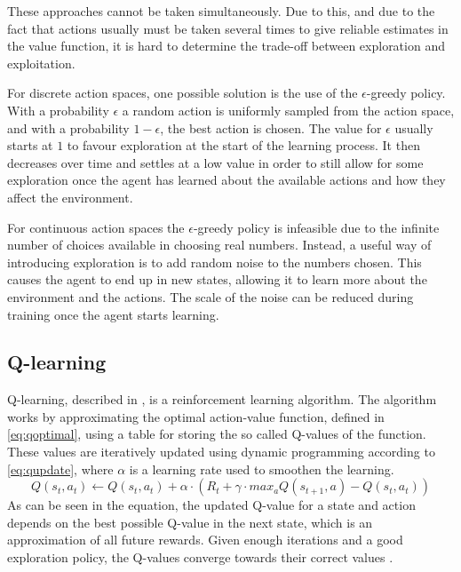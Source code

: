 \documentclass{kththesis}
\begin{document}
These approaches cannot be taken simultaneously. Due to this, and due to the fact that actions usually must be taken several times to give reliable estimates in the value function, it is hard to determine the trade-off between exploration and exploitation.

For discrete action spaces, one possible solution is the use of the $\epsilon$-greedy policy. With a probability $\epsilon$ a random action is uniformly sampled from the action space, and with a probability $1 - \epsilon$, the best action is chosen. The value for $\epsilon$ usually starts at $1$ to favour exploration at the start of the learning process. It then decreases over time and settles at a low value in order to still allow for some exploration once the agent has learned about the available actions and how they affect the environment. \parencite{sutton1998introduction}

For continuous action spaces the $\epsilon$-greedy policy is infeasible due to the infinite number of choices available in choosing real numbers. Instead, a useful way of introducing exploration is to add random noise to the numbers chosen. This causes the agent to end up in new states, allowing it to learn more about the environment and the actions. The scale of the noise can be reduced during training once the agent starts learning. \parencite{lillicrap2015continuous}

\subsection{Q-learning}
\label{subsec:qlearning}
Q-learning, described in \parencite{watkins1992q}, is a reinforcement learning algorithm. The algorithm works by approximating the optimal action-value function, defined in \autoref{eq:qoptimal}, using a table for storing the so called Q-values of the function. These values are iteratively updated using dynamic programming according to \autoref{eq:qupdate}, where $\alpha$ is a learning rate used to smoothen the learning. 
\begin{equation}
\label{eq:qupdate}
Q(s_t, a_t) \leftarrow Q(s_t, a_t) + \alpha \cdot (R_t + \gamma \cdot max_a Q(s_{t+1}, a) - Q(s_t, a_t))
\end{equation}
As can be seen in the equation, the updated Q-value for a state and action depends on the best possible Q-value in the next state, which is an approximation of all future rewards. Given enough iterations and a good exploration policy, the Q-values converge towards their correct values \parencite{watkins1992q}.
\end{document}
